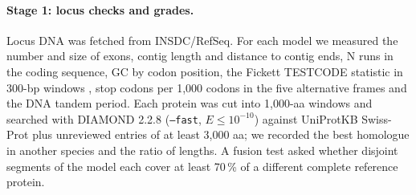 \documentclass[11pt]{article}
\begin{document}
\paragraph{Stage 1: locus checks and grades.} Locus DNA was fetched from INSDC/RefSeq. For each model we measured the
number and size of exons, contig length and distance to contig ends, N runs in the coding sequence, GC by codon position,
the Fickett TESTCODE statistic in 300-bp windows \citep{fickett1982}, stop codons per 1,000 codons in the five alternative
frames and the DNA tandem period. Each protein was cut into 1,000-aa windows and searched with DIAMOND 2.2.8
(\texttt{--fast}, $E \leq 10^{-10}$) \citep{buchfink2021} against UniProtKB Swiss-Prot plus unreviewed entries of at least
3,000 aa; we recorded the best homologue in another species and the ratio of lengths. A fusion test asked whether disjoint
segments of the model each cover at least 70\,\% of a different complete reference protein.
\end{document}
